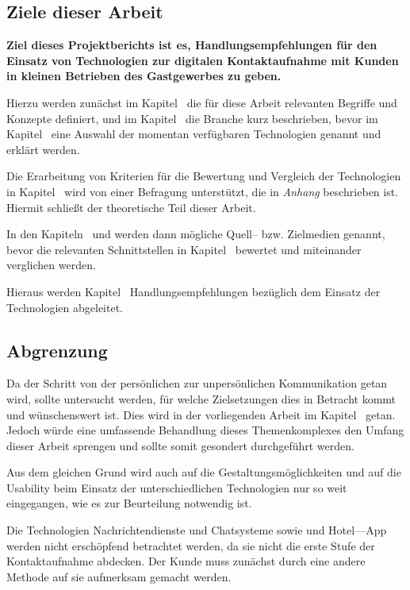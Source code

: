\subsection{Ziele dieser Arbeit} %

\textbf{Ziel dieses Projektberichts ist es, Handlungsempfehlungen für den Einsatz von Technologien zur digitalen Kontaktaufnahme mit Kunden in kleinen Betrieben des Gastgewerbes zu geben.}

Hierzu werden zunächst im Kapitel~ die für diese Arbeit relevanten Begriffe und Konzepte definiert, und im Kapitel~ die Branche kurz beschrieben, bevor im Kapitel~ eine Auswahl der momentan verfügbaren Technologien genannt und erklärt werden.

Die Erarbeitung von Kriterien für die Bewertung und Vergleich der Technologien in Kapitel~ wird von einer Befragung unterstützt, die in \textit{Anhang} beschrieben ist. Hiermit schließt der theoretische Teil dieser Arbeit. 

In den Kapiteln~ und  werden dann mögliche Quell– bzw. Zielmedien genannt, bevor  die relevanten Schnittstellen in Kapitel~ bewertet und miteinander verglichen werden.

Hieraus werden Kapitel~ Handlungsempfehlungen bezüglich dem Einsatz der Technologien abgeleitet.
\subsection{Abgrenzung} %

Da der Schritt von der persönlichen  zur unpersönlichen Kommunikation getan wird, sollte untersucht werden, für welche Zielsetzungen dies in Betracht kommt und wünschenswert ist. Dies wird in der vorliegenden Arbeit im Kapitel~ getan. Jedoch würde eine umfassende Behandlung dieses Themenkomplexes den Umfang dieser Arbeit sprengen und sollte somit gesondert durchgeführt werden.

Aus dem gleichen Grund wird auch auf die Gestaltungsmöglichkeiten und auf die Usability beim Einsatz der unterschiedlichen Technologien nur so weit eingegangen, wie es zur Beurteilung notwendig ist.

Die Technologien Nachrichtendienste und Chatsysteme sowie und Hotel––App werden nicht erschöpfend betrachtet werden, da sie nicht die erste Stufe der Kontaktaufnahme abdecken. Der Kunde muss zunächst durch eine andere Methode auf sie aufmerksam gemacht werden.
